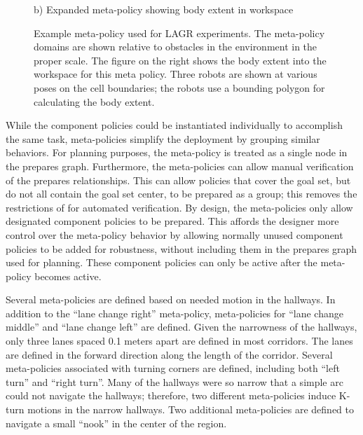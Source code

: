 \begin{figure}[bt]
\begin{center}
\begin{minipage}[b]{\linewidth}
\begin{minipage}[b]{0.45\linewidth}
   {\scriptsize b) Expanded meta-policy showing body extent in
     workspace}

 \end{minipage}
 \end{minipage}
 
 \caption[Example meta-policy for `LAGR' experiments]{Example meta-policy used for
   LAGR experiments.  The meta-policy domains are shown relative to obstacles in the
   environment in the proper scale.  The figure on the right shows the body extent
   into the workspace for this meta policy.  Three robots are shown at various poses
   on the cell boundaries; the robots use a bounding polygon for calculating the body
   extent. }
  \label{fig:lagr_meta}
\end{center}
\end{figure}

While the component policies could be instantiated individually to accomplish the
same task, meta-policies simplify the deployment by grouping similar behaviors.  For
planning purposes, the meta-policy is treated as a single node in the prepares graph.
Furthermore, the meta-policies can allow manual verification of the prepares
relationships.  This can allow policies that cover the goal set, but do not all
contain the goal set center, to be prepared as a group; this removes the restrictions
of  for automated verification.  By design, the meta-policies
only allow designated component policies to be prepared.  This affords the designer
more control over the meta-policy behavior by allowing normally unused component
policies to be added for robustness, without including them in the prepares graph
used for planning.  These component policies can only be active after the meta-policy
becomes active.


Several meta-policies are defined based on needed motion in the
hallways.  In addition to the ``lane change right'' meta-policy,
meta-policies for ``lane change middle'' and ``lane change left'' are
defined.  Given the narrowness of the hallways, only three lanes
spaced 0.1 meters apart are defined in most corridors.  The lanes are
defined in the forward direction along the length of the corridor.
Several meta-policies associated with turning corners are defined,
including both ``left turn'' and ``right turn''.  Many of the hallways
were so narrow that a simple arc could not navigate the hallways;
therefore, two different meta-policies induce K-turn motions in the
narrow hallways.  Two additional meta-policies are defined to navigate
a small ``nook'' in the center of the region.


